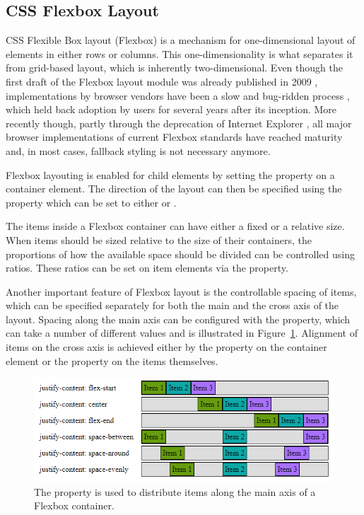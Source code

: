 \subsection{CSS Flexbox Layout}
\label{sec:Flexbox}

CSS Flexible Box layout (Flexbox) \parencite{CSSFlexbox} is a
mechanism for one-dimensional layout of elements in either rows or
columns. This one-dimensionality is what separates it from grid-based
layout, which is inherently two-dimensional.
%
Even though the first draft of the Flexbox layout module was already
published in 2009 \parencite{CSSFlexboxFirstDraft}, implementations by
browser vendors have been a slow and bug-ridden process
\parencite{CanIUseCSSFlexbox}, which held back adoption by users for
several years after its inception. More recently though, partly
through the deprecation of Internet Explorer
\parencite{IEDeprecation}, all major browser implementations of
current Flexbox standards \parencite{CSSFlexbox} have reached maturity
and, in most cases, fallback styling is not necessary anymore.

Flexbox layouting is enabled for child elements by setting the
 property on a container element. The direction
of the layout can then be specified using the 
property which can be set to either  or .

The items inside a Flexbox container can have either a fixed or a
relative size. When items should be sized relative to the size of
their containers, the proportions of how the available space should be
divided can be controlled using ratios. These ratios can be set on
item elements via the  property.

Another important feature of Flexbox layout is the controllable
spacing of items, which can be specified separately for both the main
and the cross axis of the layout. Spacing along the main axis can be
configured with the  property, which can take
a number of different values and is illustrated in
Figure~\ref{fig:FlexboxJustifyContent}. Alignment of items on the
cross axis is achieved either by the  property on
the container element or the  property on the
items themselves.

\begin{figure}[tp]
\centering
\includegraphics[keepaspectratio,width=\linewidth,height=\thirdh]
{images/flexbox-justify-content.png}
\caption[Flexbox  Property]{
The  property is used to distribute
items along the main axis of a Flexbox container. 
}
\label{fig:FlexboxJustifyContent}
\end{figure}


